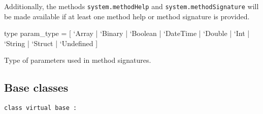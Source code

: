 \documentclass[11pt]{article}
\begin{document}
    Additionally, the methods {\tt{system.methodHelp}} and {\tt{system.methodSignature}}
    will be made available if at least one method help or method signature is
    provided.



\label{type:XmlRpcServer.param-underscoretype}\begin{ocamldoccode}
type param_type = [ `Array
  | `Binary
  | `Boolean
  | `DateTime
  | `Double
  | `Int
  | `String
  | `Struct
  | `Undefined ] 
\end{ocamldoccode}
\begin{ocamldocdescription}
Type of parameters used in method signatures.


\end{ocamldocdescription}




\subsection{Base classes}




\begin{ocamldoccode}
{\tt{class virtual base : }}\end{ocamldoccode}
\label{class:XmlRpcServer.base}
\end{document}
